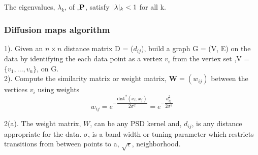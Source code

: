The eigenvalues, $\lambda_{k}$, of ,$\textbf{P}$, satisfy $\lvert\lambda\rvert_{k} < 1$
for all k.

\subsubsection{Diffusion maps algorithm}
1). Given an $n \times n$ distance matrix D = ($d_{ij}$), build a graph G = (V, E) on the data by identifying the each data point
as a vertex $v_{i}$ from the vertex set  ,V = $\{v_{1}, \ldots, v_{n}\}$, on  G.\\
2). Compute the similarity matrix or weight matrix, $\bm{W} = (w_{ij})$ between
the vertices $v_{i}$ using weights
\[
w_{ij} = e^{-\dfrac{\text{dist}^{2}(x_{i}, x_{j})}{2\sigma^2}} 
= e^{-\dfrac{d_{ij}^{2}}{2\sigma^2}}
\] 

2(a). The weight matrix, $W$, can be any PSD kernel and, $d_{ij}$, is any distance appropriate for the data. $\sigma$, is a band width or tuning parameter which restricts transitions from between points to a, $\sqrt{\epsilon}$, neighborhood.




\newpage

